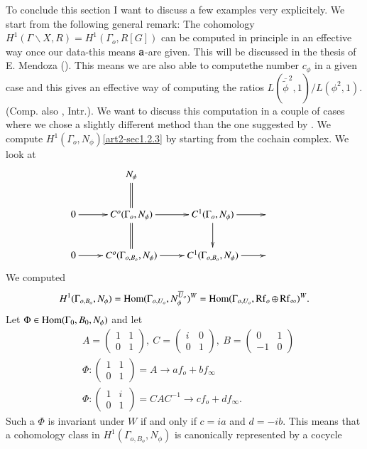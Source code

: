 To conclude this section I want to discuss a few examples very explicitely. We start from the following general remark: The cohomology $H^{1}(\Gamma\backslash X,R)=H^{1}(\Gamma_{o},R[G])$ can be computed in principle in an effective way once our data-this means $\mathsf{a}$-are given. This will be discussed in the thesis of E. Mendoza (\cite{art2-key15}). This means we are also able to compute\pageoriginale the number $c_{\phi}$ in a given case and this gives an effective way of computing the ratios $L(\overline{\widetilde{\phi}}^{2},1)/L(\phi^{2},1)$. (Comp. also \cite{art2-key23}, Intr.). We want to discuss this computation in a couple of cases where we chose a slightly different method than the one suggested by \cite{art2-key15}. We compute $H^{1}(\Gamma_{o},N_{\phi})$\eqref{art2-sec1.2.3} by starting from the cochain complex. We look at
\[
\xymatrix{
 & N_{\phi}\ar@{=}[d] & & &\\
0\ar[r] & C^{o}(\Gamma_{o},N_{\phi})\ar@{=}[d]\ar[r] & C^{1}(\Gamma_{o},N_{\phi})\ar[r]\ar[d] &\\
0\ar[r] & C^{o}(\Gamma_{o,B_{o}},N_{\phi})\ar[r] & C^{1}(\Gamma_{o,B_{o}},N_{\phi})\ar[r] &
}
\]
We computed 
$$
H^{1}(\Gamma_{o,B_{o}},N_{\phi})=\operatorname{Hom}(\Gamma_{o,U_{o}},N^{\overline{U}_{o}}_{\phi})^{W}=\operatorname{Hom}(\Gamma_{o,U_{o}},\operatorname{Rf}_{o}\oplus \operatorname{Rf}_{\infty})^{W}.
$$ 
Let $\Phi\in \operatorname{Hom}(\Gamma_{0},B_{0},N_{\phi})$ and let
\begin{align*}
& A=\left(\begin{matrix} 1 & 1\\ 0 & 1\end{matrix}\right), \ C=\left(\begin{matrix} i & 0\\ 0 & 1\end{matrix}\right), \ B=\left(\begin{matrix} 0 & 1\\ -1 & 0\end{matrix}\right)\\[4pt]
& \Phi : \left(\begin{matrix} 1 & 1\\ 0 & 1\end{matrix}\right)=A\to af_{o}+bf_{\infty}\\[4pt]
& \Phi : \left(\begin{matrix} 1 & i\\ 0 & 1\end{matrix}\right)=CAC^{-1}\to cf_{o}+df_{\infty}.
\end{align*}
Such a $\Phi$ is invariant under $W$ if and only if $c=ia$ and $d=-ib$. This means that a cohomology class in $H^{1}(\Gamma_{o,B_{o}},N_{\phi})$ is canonically represented by a cocycle
